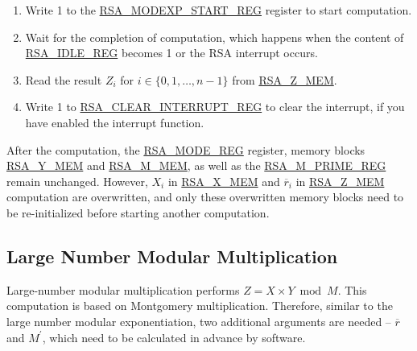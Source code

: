 \documentclass[main\_\_EN.tex]{subfiles}
\begin{document}
\begin{enumerate}
       Users need to write data to each memory block only according to the length of the number; data beyond this length are ignored.

    \item Write 1 to the \hyperref[regdesc:RSAMODEXPSTARTREG]{RSA\_MODEXP\_START\_REG} register to start computation.

    \item Wait for the completion of computation, which happens when the content of \hyperref[regdesc:RSAIDLEREG]{RSA\_IDLE\_REG} becomes 1 or the RSA interrupt occurs.
        
    \item Read the result \begin{math}Z_{i}\end{math}
        for \begin{math}i \in \{ 0, 1, \dots, n-1 \} \end{math}
        from \hyperref[regdesc:RSAmemory]{RSA\_Z\_MEM}.

    \item Write 1 to \hyperref[regdesc:RSACLEARINTERRUPTREG]{RSA\_CLEAR\_INTERRUPT\_REG} to clear the interrupt, if you have enabled the interrupt function.

\end{enumerate}

After the computation, the \hyperref[regdesc:RSAMODEXPMODEREG]{RSA\_MODE\_REG} register, memory blocks \hyperref[regdesc:RSAmemory]{RSA\_Y\_MEM} and \hyperref[regdesc:RSAmemory]{RSA\_M\_MEM}, as well as the \hyperref[regdesc:RSAMPRIMEREG]{RSA\_M\_PRIME\_REG} remain unchanged. However, \begin{math}X_{i}\end{math} in \hyperref[regdesc:RSAmemory]{RSA\_X\_MEM} and \begin{math}\overline{r}_{i}\end{math} in \hyperref[regdesc:RSAmemory]{RSA\_Z\_MEM} computation are overwritten, and only these overwritten memory blocks need to be re-initialized before starting another computation.

\subsection{Large Number Modular Multiplication}

Large-number modular multiplication performs \begin{math}Z = X \times Y \bmod M\end{math}. This computation is based on Montgomery multiplication. 
Therefore, similar to the large number modular exponentiation, two additional arguments are needed -- \begin{math}\overline{r}\end{math} and
\begin{math}M^{\prime}\end{math}, which need to be calculated in advance by software.
\end{document}
